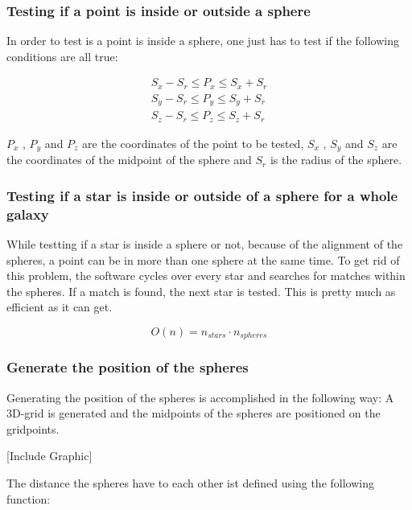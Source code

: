 \subsubsection{Testing if a point is inside or outside a sphere}

In order to test is a point is inside a sphere, one just has to test if the
following conditions are all true:

\begin{equation}
  \begin{split}
    S_x - S_r \leq P_x \leq S_x + S_r \\
    S_y - S_r \leq P_y \leq S_y + S_r \\
    S_z - S_r \leq P_z \leq S_z + S_r
  \end{split}
\end{equation}

\( P_x \) , \( P_y \) and \( P_z \) are the coordinates of the point to be tested,
\( S_x \) , \( S_y \) and \( S_z \) are the coordinates of the midpoint of the sphere and
\( S_r \) is the radius of the sphere.

\subsubsection{Testing if a star is inside or outside of a sphere for a whole galaxy}

While testting if a star is inside a sphere or not, because of the alignment
of the spheres, a point can be in more than one sphere at the same time.
To get rid of this problem, the software cycles over every star and searches
for matches within the spheres. If a match is found, the next star is tested.
This is pretty much as efficient as it can get.

\begin{equation}
  O(n) = n_{stars} \cdot n_{spheres}
\end{equation}

\subsubsection{Generate the position of the spheres}

Generating the position of the spheres is accomplished in the following way:
A 3D-grid is generated and the midpoints of the spheres are positioned on the
gridpoints.

[Include Graphic]

The distance the spheres have to each other ist defined using the following
function:

